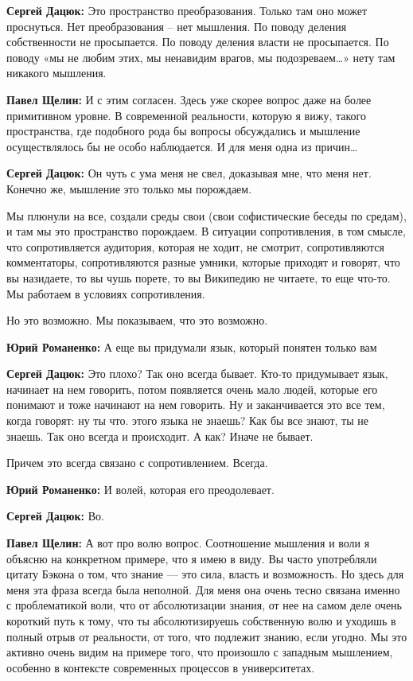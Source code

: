 \textbf{Сергей Дацюк:} Это пространство преобразования. Только там оно может проснуться.
Нет преобразования – нет мышления. По поводу деления собственности не
просыпается. По поводу деления власти не просыпается. По поводу «мы не любим
этих, мы ненавидим врагов, мы подозреваем…» нету там никакого мышления.

\textbf{Павел Щелин:} И с этим согласен. Здесь уже скорее вопрос даже на более
примитивном уровне. В современной реальности, которую я вижу, такого
пространства, где подобного рода бы вопросы обсуждались и мышление
осуществлялось бы не особо наблюдается. И для меня одна из причин…

\textbf{Сергей Дацюк:} Он чуть с ума меня не свел, доказывая мне, что меня нет. Конечно
же, мышление это только мы порождаем.

Мы плюнули на все, создали среды свои (свои софистические беседы по средам), и
там мы это пространство порождаем. В ситуации сопротивления, в том смысле, что
сопротивляется аудитория, которая не ходит, не смотрит, сопротивляются
комментаторы, сопротивляются разные умники, которые приходят и говорят, что вы
назидаете, то вы чушь порете, то вы Википедию не читаете, то еще что-то. Мы
работаем в условиях сопротивления.

Но это возможно. Мы показываем, что это возможно.

\textbf{Юрий Романенко:} А еще вы придумали язык, который понятен только вам

\textbf{Сергей Дацюк:} Это плохо? Так оно всегда бывает. Кто-то придумывает язык,
начинает на нем говорить, потом появляется очень мало людей, которые его
понимают и тоже начинают на нем говорить. Ну и заканчивается это все тем, когда
говорят: ну ты что. этого языка не знаешь? Как бы все знают, ты не знаешь. Так
оно всегда и происходит. А как? Иначе не бывает.

Причем это всегда связано с сопротивлением. Всегда.

\textbf{Юрий Романенко:} И волей, которая его преодолевает.

\textbf{Сергей Дацюк:} Во.

\textbf{Павел Щелин:} А вот про волю вопрос. Соотношение мышления и воли я объясню на
конкретном примере, что я имею в виду. Вы часто употребляли цитату Бэкона о
том, что знание — это сила, власть и возможность. Но здесь для меня эта фраза
всегда была неполной. Для меня она очень тесно связана именно с проблематикой
воли, что от абсолютизации знания, от нее на самом деле очень короткий путь к
тому, что ты абсолютизируешь собственную волю и уходишь в полный отрыв от
реальности, от того, что подлежит знанию, если угодно. Мы это активно очень
видим на примере того, что произошло с западным мышлением, особенно в контексте
современных процессов в университетах.

